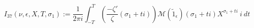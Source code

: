 \begin{definition}[I₃₇]
\label{I37}
\leanok
$$
  I_{37}(\nu, \epsilon, X, T, \sigma_1) := \frac{1}{2\pi i} \int_{-T}^{T}
  \left(
  \frac{-\zeta'}\zeta(\sigma_1 + t i)
  \right)
    \mathcal M(\widetilde 1_\epsilon)(\sigma_1 + t i)
  X^{\sigma_1 + t i} \ i \ dt
  $$
\end{definition}
